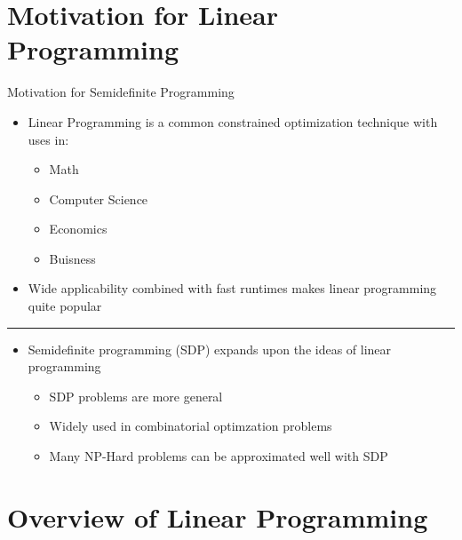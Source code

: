 \documentclass[
	11pt, %
]{beamer}
\begin{document}
\section{Motivation for Linear Programming}
\begin{frame}[label={sec:org0f20b1e}]{Motivation for Semidefinite Programming}
\begin{itemize}
\item Linear Programming is a common constrained optimization technique with uses in:
\begin{itemize}
\item Math
\item Computer Science
\item Economics
\item Buisness
\end{itemize}
\item Wide applicability combined with fast runtimes makes linear programming quite popular
\end{itemize}
\pause
\noindent\rule{\textwidth}{0.5pt}
\begin{itemize}
\item Semidefinite programming (SDP) expands upon the ideas of linear programming
\begin{itemize}
\item SDP problems are more general
\item Widely used in combinatorial optimzation problems
\item Many NP-Hard problems can be approximated well with SDP
\end{itemize}
\end{itemize}
\end{frame}

\section{Overview of Linear Programming}
\end{document}
